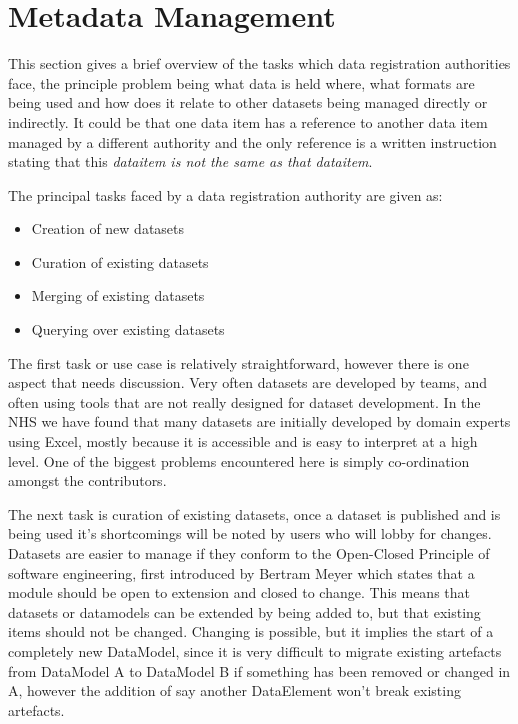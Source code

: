 \documentclass{llncs}
\begin{document}
\subsection{}


\section{Metadata Management}
This section gives a brief overview of the tasks which data registration authorities face, the principle problem being what data is held where, what formats are being used and how does it relate to other datasets being managed directly or indirectly. It could be that one data item has a reference to another data item managed by a different authority and the only reference is a written instruction stating that this \emph{dataitem is not the same as that dataitem}. 

The principal tasks faced by a data registration authority are given as:
\begin{itemize}
\item Creation of new datasets
\item Curation of existing datasets
\item Merging of existing datasets
\item Querying over existing datasets
\end{itemize}

The first task or use case is relatively straightforward, however there is one aspect that needs discussion. Very often datasets are developed by teams, and often using tools that are not really designed for dataset development. In the NHS we have found that many datasets are initially developed by domain experts using Excel, mostly because it is accessible and is easy to interpret at a high level. One of the biggest problems encountered here is simply co-ordination amongst the contributors. 

The next task is curation of existing datasets, once a dataset is published and is being used it's shortcomings will be noted by users who will lobby for changes. Datasets are easier to manage if they conform to the Open-Closed Principle of software engineering, first introduced by Bertram Meyer \cite{Meyer} which states that a module should be open to extension and closed to change. This means that datasets or datamodels can be extended by being added to, but that existing items should not be changed. Changing is possible, but it implies the start of a completely new DataModel, since it is very difficult to migrate existing artefacts from DataModel A to DataModel B if something has been removed or changed in A, however the addition of say another DataElement won't break existing artefacts.
\end{document}

